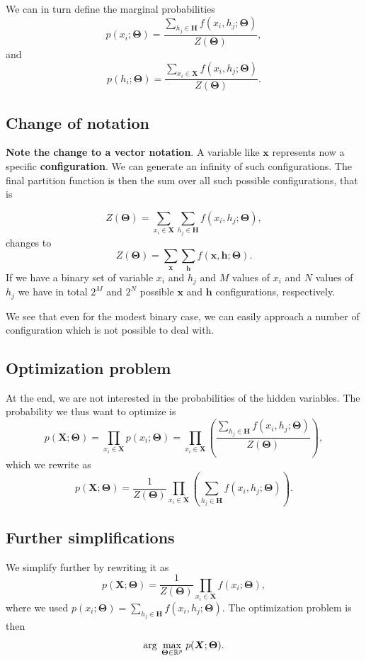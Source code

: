\documentclass[%
oneside,                 %
final,                   %
10pt]{article}
\begin{document}
We can in turn define the marginal probabilities
\[
p(x_i;\bm{\Theta}) = \frac{\sum_{h_j\in \bm{H}}f(x_i,h_j;\bm{\Theta})}{Z(\bm{\Theta})},
\]
and 
\[
p(h_i;\bm{\Theta}) = \frac{\sum_{x_i\in \bm{X}}f(x_i,h_j;\bm{\Theta})}{Z(\bm{\Theta})}.
\]

\subsection*{Change of notation}

\textbf{Note the change to a vector notation}. A variable like $\bm{x}$
represents now a specific \textbf{configuration}. We can generate an infinity
of such configurations. The final partition function is then the sum
over all such possible configurations, that is

\[
Z(\bm{\Theta})=\sum_{x_i\in \bm{X}}\sum_{h_j\in \bm{H}} f(x_i,h_j;\bm{\Theta}),
\]
changes to
\[
Z(\bm{\Theta})=\sum_{\bm{x}}\sum_{\bm{h}} f(\bm{x},\bm{h};\bm{\Theta}).
\]
If we have a binary set of variable $x_i$ and $h_j$ and $M$ values of $x_i$ and $N$ values of $h_j$ we have in total $2^M$ and $2^N$ possible $\bm{x}$ and $\bm{h}$ configurations, respectively.

We see that even for the modest binary case, we can easily approach a
number of configuration which is not possible to deal with.

\subsection*{Optimization problem}

At the end, we are not interested in the probabilities of the hidden variables. The probability we thus want to optimize is 
\[
p(\bm{X};\bm{\Theta})=\prod_{x_i\in \bm{X}}p(x_i;\bm{\Theta})=\prod_{x_i\in \bm{X}}\left(\frac{\sum_{h_j\in \bm{H}}f(x_i,h_j;\bm{\Theta})}{Z(\bm{\Theta})}\right),
\]
which we rewrite as
\[
p(\bm{X};\bm{\Theta})=\frac{1}{Z(\bm{\Theta})}\prod_{x_i\in \bm{X}}\left(\sum_{h_j\in \bm{H}}f(x_i,h_j;\bm{\Theta})\right).
\]

\subsection*{Further simplifications}

We simplify further by rewriting it as
\[
p(\bm{X};\bm{\Theta})=\frac{1}{Z(\bm{\Theta})}\prod_{x_i\in \bm{X}}f(x_i;\bm{\Theta}),
\]
where we used $p(x_i;\bm{\Theta}) = \sum_{h_j\in \bm{H}}f(x_i,h_j;\bm{\Theta})$.
The optimization problem is then
\[
{\displaystyle \mathrm{arg} \hspace{0.1cm}\max_{\bm{\bm{\Theta}}\in {\mathbb{R}}^{p}}} \hspace{0.1cm}p(\bm{X};\bm{\Theta}).
\]
\end{document}
